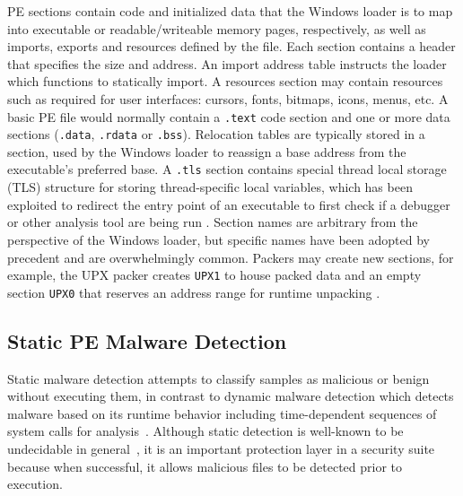 PE sections contain code and initialized data that the Windows loader is to map into executable or readable/writeable memory pages, respectively, as well as imports, exports and resources defined by the file.  Each section contains a header that specifies the size and address.  An import address table instructs the loader which functions to statically import.  A resources section may contain resources such as required for user interfaces: cursors, fonts, bitmaps, icons, menus, etc.  A basic PE file would normally contain a \texttt{.text} code section and one or more data sections (\texttt{.data}, \texttt{.rdata} or \texttt{.bss}).  Relocation tables are typically stored in a  section, used by the Windows loader to reassign a base address from the executable's preferred base.  A \texttt{.tls} section contains special thread local storage (TLS) structure for storing thread-specific local variables, which has been exploited to redirect the entry point of an executable to first check if a debugger or other analysis tool are being run \cite{brand2010malware}.  Section names are arbitrary from the perspective of the Windows loader, but specific names have been adopted by precedent and are overwhelmingly common.  Packers may create new sections, for example, the UPX packer creates \texttt{UPX1} to house packed data and an empty section \texttt{UPX0} that reserves an address range for runtime unpacking \cite{devi2012pe}.
\pagebreak[3]

\subsection{Static PE Malware Detection} \label{sec:staticpe}
Static malware detection attempts to classify samples as malicious or benign without executing them, in contrast to dynamic malware detection which detects malware based on its runtime behavior including time-dependent sequences of system calls for analysis~\cite{dahl2013large,pascanu2015malware,athiwaratkun2017malware}. Although static detection is well-known to be undecidable in general~\cite{cohen1987computer}, it is an important protection layer in a security suite because when successful, it allows malicious files to be detected prior to execution. 

